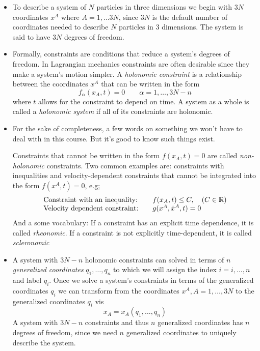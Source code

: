\documentclass[11pt, a4paper]{article}
\newcommand{\R}{\mathbb{R}} %
\begin{document}
\begin{itemize}
	\item To describe a system of $ N $ particles in three dimensions we begin with $ 3N $ coordinates $ x^{A} $ where $ A = 1, \ldots 3N$, since $ 3N $ is the default number of coordinates needed to describe $ N$ particles in 3 dimensions. The system is said to have $ 3N $ degrees of freedom.
	
	\item Formally, constraints are conditions that reduce a system's degrees of freedom. In Lagrangian mechanics constraints are often desirable since they make a system's motion simpler. A \textit{holonomic constraint} is a relationship between the coordinates $ x^{A} $ that can be written in the form
	\begin{equation*}
		f_{\alpha}(x_{A}, t ) = 0 \qquad \alpha = 1, \ldots, 3N - n
	\end{equation*}
	where $ t $ allows for the constraint to depend on time. A system as a whole is called a \textit{holonomic system} if all of its constraints are holonomic.

	\item For the sake of completeness, a few words on something we won't have to deal with in this course. But it's good to know such things exist.
	
	Constraints that cannot be written in the form $ f(x_{A}, t) = 0 $ are called \textit{non-holonomic} constraints. Two common examples are: constraints with inequalities and velocity-dependent constraints that cannot be integrated into the form $ f(x^{A}, t) = 0 $, e.g;
	\[
	\begin{array}{l  l}
		\text{Constraint with an inequality:} & \quad f(x_{A}, t) \leq C, \quad (C \in \R)\\
		\text{Velocity dependent constraint:} & \quad g(x^A, \dot{x}^A, t) = 0
	\end{array}
	\]
	And a some vocabulary: If a constraint has an explicit time dependence, it is called \textit{rheonomic}. If a constraint is not explicitly time-dependent, it is called \textit{scleronomic}

	
	\item A system with $ 3N - n $ holonomic constraints can solved in terms of $ n $ \textit{generalized coordinates} $ q_{1}, \ldots, q_{n} $ to which we will assign the index $ i = i, \ldots, n $ and label $ q_{i} $. Once we solve a system's constraints in terms of the generalized coordinates $ q_{i} $ we can transform from the coordinates $ x^{A}, A = 1, \ldots, 3N $ to the generalized coordinates $ q_{i} $ vis
	\begin{equation*}
		x_{A} = x_{A} (q_{1}, \ldots, q_{n})
	\end{equation*}
	A system with $ 3N - n $ constraints and thus $ n $ generalized coordinates has $ n $ degrees of freedom, since we need $ n $ generalized coordinates to uniquely describe the system.
	
\end{itemize}
	
\end{document}
